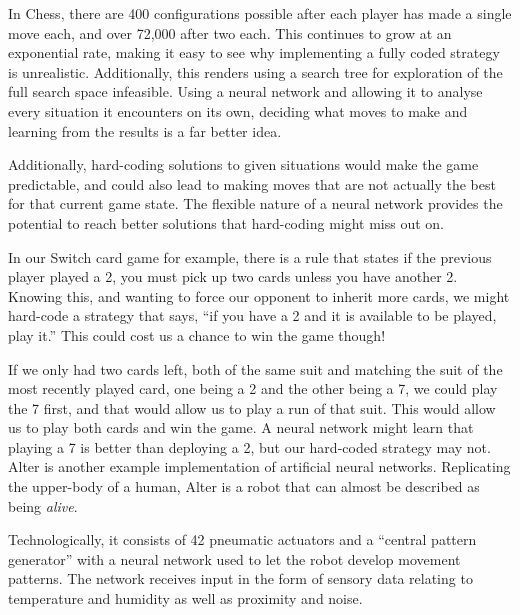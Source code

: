 \documentclass[12pt,a4paper]{article}
\begin{document}
In Chess, there are 400 configurations possible after each player has made a single move each, and over 72,000 after two each\citep{20}. This continues to grow at an exponential rate, making it easy to see why implementing a fully coded strategy is unrealistic. Additionally, this renders using a search tree for exploration of the full search space infeasible\citep{29}. Using a neural network and allowing it to analyse every situation it encounters on its own, deciding what moves to make and learning from the results is a far better idea. 

Additionally, hard-coding solutions to given situations would make the game predictable, and could also lead to making moves that are not actually the best for that current game state. The flexible nature of a neural network provides the potential to reach better solutions that hard-coding might miss out on. 

In our Switch card game for example, there is a rule that states if the previous player played a 2, you must pick up two cards unless you have another 2. Knowing this, and wanting to force our opponent to inherit more cards, we might hard-code a strategy that says, \enquote{if you have a 2 and it is available to be played, play it.} This could cost us a chance to win the game though! 

If we only had two cards left, both of the same suit and matching the suit of the most recently played card, one being a 2 and the other being a 7, we could play the 7 first, and that would allow us to play a run of that suit. This would allow us to play both cards and win the game. A neural network might learn that playing a 7 is better than deploying a 2, but our hard-coded strategy may not.\\


Alter\citep{21} is another example implementation of artificial neural networks. Replicating the upper-body of a human, Alter is a robot that can almost be described as being \textit{alive}. 

Technologically, it consists of 42 pneumatic actuators and a \enquote{central pattern generator} with a neural network used to let the robot develop movement patterns\citep{21}. The network receives input in the form of sensory data relating to temperature and humidity as well as proximity and noise\citep{22}. 
\end{document}
